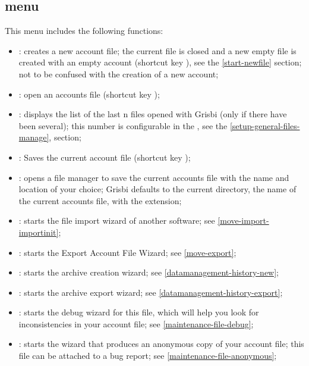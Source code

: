 \subsection{ menu\label{home-menus-file}}

This menu includes the following functions:

\begin{itemize}
	\item {}: creates a new account file; the current file is closed and a new empty file is created with an empty account (shortcut key ),  see the \vref{start-newfile} section; not to be confused with the creation of a new account;
	\item {}: open an accounts file  (shortcut key  );
	\item {}: displays the list of the last n files opened with Grisbi (only if there have been several); this number is configurable in the , see the \vref{setup-general-files-manage},  section;
	\item {}: Saves the current account file  (shortcut key );
	\item {}: opens a file manager to save the current accounts file with the name and location of your choice; Grisbi defaults to the current directory, the name of the current accounts file, with the  extension;
	\item {}: starts the file import wizard of another software; see  \vref{move-import-importinit};
	\item {}: starts the Export Account File Wizard; see \vref{move-export};	
	\item {}: starts the archive creation wizard; see \vref{datamanagement-history-new};	
	\item {}: starts the archive export wizard; see \vref{datamanagement-history-export};
	\item {}: starts the debug wizard for this file, which will help you look for inconsistencies in your account file; see  \vref{maintenance-file-debug};
	\item {}: starts the wizard that produces an anonymous copy of your account file; this file can be attached to a bug report; see \vref{maintenance-file-anonymous};	

\end{itemize}
